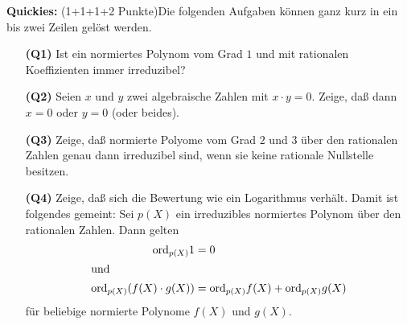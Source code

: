 \documentclass{algsheet}
\begin{document}
\begin{exercise}\textbf{Quickies:} (1+1+1+2 Punkte)\newline Die folgenden Aufgaben können ganz kurz in ein bis zwei Zeilen gelöst werden.  
\begin{itemize}
 \item[\textbf{(Q1)}]%
        Ist ein normiertes Polynom vom Grad \(1\) und mit rationalen
    Koeffizienten immer irreduzibel?
  \item[\textbf{(Q2)}]%
                      Seien \(x\) und \(y\) zwei algebraische Zahlen mit \(x \cdot y = 0\).
    Zeige, daß dann \(x = 0\) oder \(y = 0\) (oder beides).

\item[\textbf{(Q3)}]%
           Zeige, daß normierte Polyome vom Grad \(2\) und \(3\) über den rationalen
    Zahlen genau dann irreduzibel sind, wenn sie keine rationale Nullstelle
    besitzen.    

\item[\textbf{(Q4)}]%
       Zeige, daß sich die Bewertung wie ein Logarithmus verhält. Damit ist folgendes
    gemeint: Sei \(p(X)\) ein irreduzibles normiertes Polynom über den rationalen
    Zahlen. Dann gelten
    \begin{align}
        \mathrm{ord}_{p(X)} 1 & = 0\\
        \shortintertext{und}
        \mathrm{ord}_{p(X)} (f(X) \cdot g(X)) & = \mathrm{ord}_{p(X)} f(X) + \mathrm{ord}_{p(X)} g(X)
    \end{align}
    für beliebige normierte Polynome \(f(X)\) und \(g(X)\).
\end{itemize}


   
\end{exercise}
\end{document}
